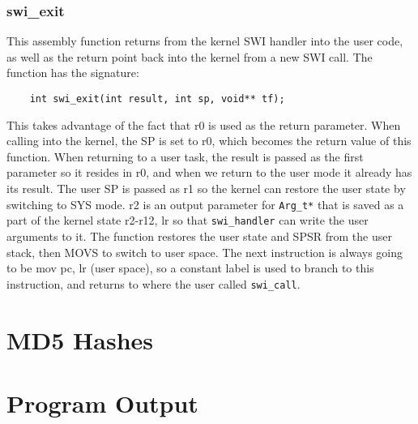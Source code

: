 \documentclass[12pt]{article}
\begin{document}
\subsubsection{swi\_exit}
This assembly function returns from the kernel SWI handler into the user code, as well as the return point back into the kernel from a new SWI call. The function has the signature:
\begin{center}
  \begin{verbatim}
    int swi_exit(int result, int sp, void** tf);
  \end{verbatim}
\end{center}
This takes advantage of the fact that r0 is used as the return parameter. When calling into the kernel, the SP is set to r0, which becomes the return value of this function. When returning to a user task, the result is passed as the first parameter so it resides in r0, and when we return to the user mode it already has its result.
The user SP is passed as r1 so the kernel can restore the user state by switching to SYS mode.
r2 is an output parameter for \texttt{Arg\_t*} that is saved as a part of the kernel state {r2-r12, lr} so that \texttt{swi\_handler} can write the user arguments to it.
The function restores the user state and SPSR from the user stack, then MOVS to switch to user space. The next instruction is always going to be mov pc, lr (user space), so a constant label is used to branch to this instruction, and returns to where the user called \texttt{swi\_call}.
\\[2\baselineskip]

\section{MD5 Hashes}
\section{Program Output}
\end{document}
